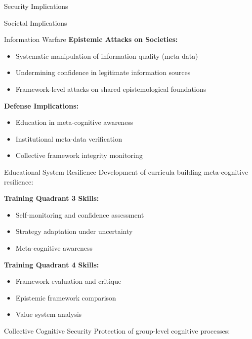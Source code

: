 \documentclass[
  ignorenonframetext,
]{beamer}
\providecommand{\tightlist}{%
  \setlength{\itemsep}{0pt}\setlength{\parskip}{0pt}}
\begin{document}
\begin{frame}{Security Implications}
\begin{block}{Societal Implications}
\begin{block}{Information Warfare}
\textbf{Epistemic Attacks on Societies:}

\begin{itemize}
\tightlist
\item
  Systematic manipulation of information quality (meta-data)
\item
  Undermining confidence in legitimate information sources
\item
  Framework-level attacks on shared epistemological foundations
\end{itemize}

\textbf{Defense Implications:}

\begin{itemize}
\tightlist
\item
  Education in meta-cognitive awareness
\item
  Institutional meta-data verification
\item
  Collective framework integrity monitoring
\end{itemize}
\end{block}

\begin{block}{Educational System Resilience}
\protect{}\label{educational-system-resilience}
Development of curricula building meta-cognitive resilience:

\textbf{Training Quadrant 3 Skills:}

\begin{itemize}
\tightlist
\item
  Self-monitoring and confidence assessment
\item
  Strategy adaptation under uncertainty
\item
  Meta-cognitive awareness
\end{itemize}

\textbf{Training Quadrant 4 Skills:}

\begin{itemize}
\tightlist
\item
  Framework evaluation and critique
\item
  Epistemic framework comparison
\item
  Value system analysis
\end{itemize}
\end{block}

\begin{block}{Collective Cognitive Security}
\protect{}\label{collective-cognitive-security}
Protection of group-level cognitive processes:


\end{block}
\end{block}
\end{frame}
\end{document}

